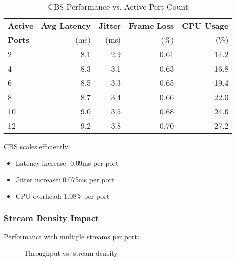 \documentclass[10pt, journal, compsoc]{IEEEtran}
\begin{document}
\begin{table}[h]
\centering
\caption{CBS Performance vs. Active Port Count}
\label{tab:port_scalability}
\begin{tabular}{lrrrr}
\toprule
\textbf{Active} & \textbf{Avg Latency} & \textbf{Jitter} & \textbf{Frame Loss} & \textbf{CPU Usage} \\
\textbf{Ports} & (ms) & (ms) & (\%) & (\%) \\
\midrule
2 & 8.1 & 2.9 & 0.61 & 14.2 \\
4 & 8.3 & 3.1 & 0.63 & 16.8 \\
6 & 8.5 & 3.3 & 0.65 & 19.4 \\
8 & 8.7 & 3.4 & 0.66 & 22.0 \\
10 & 9.0 & 3.6 & 0.68 & 24.6 \\
12 & 9.2 & 3.8 & 0.70 & 27.2 \\
\bottomrule
\end{tabular}
\end{table}

CBS scales efficiently:
\begin{itemize}
    \item Latency increase: 0.09ms per port
    \item Jitter increase: 0.075ms per port
    \item CPU overhead: 1.08\% per port
\end{itemize}

\subsubsection{Stream Density Impact}

Performance with multiple streams per port:

\begin{figure}[h]
\centering
{}
\caption{Throughput vs. stream density}
\label{fig:stream_density}
\end{figure}
\end{document}
